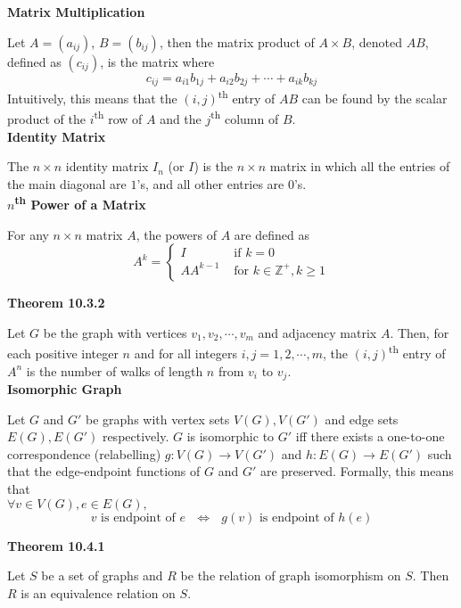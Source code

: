 \documentclass[a4paper]{article}
\newcommand{\subheading}[1]{{\scriptsize\textbf{#1}}}
\begin{document}
\begin{multicols*}{4}
\subheading{Matrix Multiplication}

Let $A = (a_{ij})$, $B = (b_{ij})$, then the matrix product of $A \times B$,
denoted $AB$, defined as $(c_{ij})$, is the matrix where
$$c_{ij} = a_{i1}b_{1j} + a_{i2}b_{2j} + \cdots + a_{ik}b_{kj}$$
Intuitively, this means that the $(i, j)$\textsuperscript{th} entry of $AB$ can
be found by the scalar product of the $i$\textsuperscript{th} row of $A$ and the
$j$\textsuperscript{th} column of $B$.\\

\subheading{Identity Matrix}

The $n \times n$ identity matrix $I_n$ (or $I$) is the $n \times n$ matrix in
which all the entries of the main diagonal are $1$'s, and all other entries are
$0$'s.\\

\subheading{$n$\textsuperscript{th} Power of a Matrix}

For any $n \times n$ matrix $A$, the powers of $A$ are defined as
$$A^k = \begin{cases}
  I & \text{ if $k=0$} \\
  AA^{k-1} & \text{ for $k \in \mathbb{Z}^+, k \geq 1$}
\end{cases}$$

\subheading{Theorem 10.3.2}

Let $G$ be the graph with vertices $v_1, v_2, \cdots, v_m$ and adjacency matrix
$A$. Then, for each positive integer $n$ and for all integers $i, j = 1, 2,
\cdots, m$, the $(i, j)$\textsuperscript{th} entry of $A^n$ is the number of
walks of length $n$ from $v_i$ to $v_j$.\\

\subheading{Isomorphic Graph}

Let $G$ and $G'$ be graphs with vertex sets $V(G), V(G')$ and edge sets $E(G),
E(G')$ respectively. $G$ is isomorphic to $G'$ iff there exists a one-to-one
correspondence (relabelling) $g: V(G) \rightarrow V(G')$ and $h: E(G)
\rightarrow E(G')$ such that the edge-endpoint functions of $G$ and $G'$ are
preserved. Formally, this means that\\

\hspace{0.5em}$\forall v \in V(G), e \in E(G),$
$$\text{$v$ is endpoint of $e$ $\iff$ $g(v)$ is endpoint of $h(e)$}$$

\subheading{Theorem 10.4.1}

Let $S$ be a set of graphs and $R$ be the relation of graph isomorphism on $S$.
Then $R$ is an equivalence relation on $S$.\\


\end{multicols*}
\end{document}
